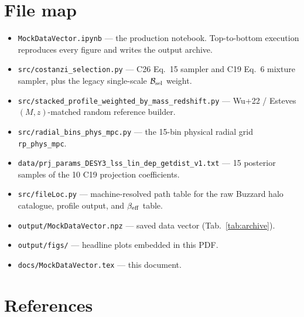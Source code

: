 \documentclass[a4paper, 11pt]{article}
\newcommand{\Bsel}{\mathcal{B}_{\rm sel}}
\newcommand{\blk}[1]{\textcolor{datablockcol}{\texttt{#1}}}
\newcommand{\pyfile}[1]{{\small\texttt{#1}}}
\begin{document}
\section{File map}
\label{sec:files}

\begin{itemize}
  \setlength\itemsep{1pt}
  \item \pyfile{MockDataVector.ipynb} --- the production notebook.
    Top-to-bottom execution reproduces every figure and writes the
    output archive.
  \item \pyfile{src/costanzi\_selection.py} --- C26 Eq.~15 sampler and
    C19 Eq.~6 mixture sampler, plus the legacy single-scale $\Bsel$
    weight.
  \item \pyfile{src/stacked\_profile\_weighted\_by\_mass\_redshift.py} ---
    Wu+22 / Esteves $(M, z)$-matched random reference builder.
  \item \pyfile{src/radial\_bins\_phys\_mpc.py} --- the 15-bin physical
    radial grid \blk{rp\_phys\_mpc}.
  \item \pyfile{data/prj\_params\_DESY3\_lss\_lin\_dep\_getdist\_v1.txt}
    --- 15 posterior samples of the 10 C19 projection coefficients.
  \item \pyfile{src/fileLoc.py} --- machine-resolved path table for the
    raw Buzzard halo catalogue, profile output, and $\beta_{\rm eff}$
    table.
  \item \pyfile{output/MockDataVector.npz} --- saved data vector
    (Tab.~\ref{tab:archive}).
  \item \pyfile{output/figs/} --- headline plots embedded in this PDF.
  \item \pyfile{docs/MockDataVector.tex} --- this document.
\end{itemize}

\section{References}
\label{sec:refs}
\end{document}
